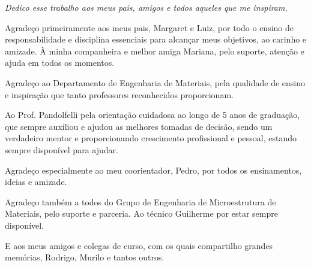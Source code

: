 \documentclass[
	12pt,				%
	openright,			%
	twoside,			%
	a4paper,			%
	chapter=TITLE,		%
	english,			%
	french,				%
	spanish,			%
	brazil,				%
	hyphens
	]{abntex2}
\theoremstyle{definition}
\theoremstyle{definition}
\begin{document}

    
  

\begin{dedicatoria}
   \vspace*{\fill}
   \centering
   \noindent
   \textit{Dedico esse trabalho aos meus pais, amigos e todos aqueles que me inspiram.} \vspace*{\fill}
\end{dedicatoria}

\begin{agradecimentos}

Agradeço primeiramente aos meus pais, Margaret e Luiz, por todo o ensino de
responsabilidade e disciplina essenciais para alcançar meus objetivos, ao
carinho e amizade. À minha companheira e melhor amiga Mariana, pelo suporte,
atenção e ajuda em todos os momentos.

Agradeço ao Departamento de Engenharia de Materiais, pela qualidade de ensino e
inspiração que tanto professores reconhecidos proporcionam.

Ao Prof. Pandolfelli pela orientação cuidadosa ao longo de 5 anos de graduação, que sempre
auxiliou e ajudou as melhores tomadas de decisão, sendo um verdadeiro mentor e proporcionando
crescimento profissional e pessoal, estando sempre disponível para ajudar.

Agradeço especialmente ao meu coorientador, Pedro, por todos os ensinamentos,
ideias e amizade.

Agradeço também a todos do Grupo de Engenharia de Microestrutura de Materiais,
pelo suporte e parceria. Ao técnico Guilherme por estar sempre disponível.

E aos meus amigos e colegas de curso, com os quais compartilho grandes memórias,
Rodrigo, Murilo e tantos outros. 

\end{agradecimentos}
\end{document}
